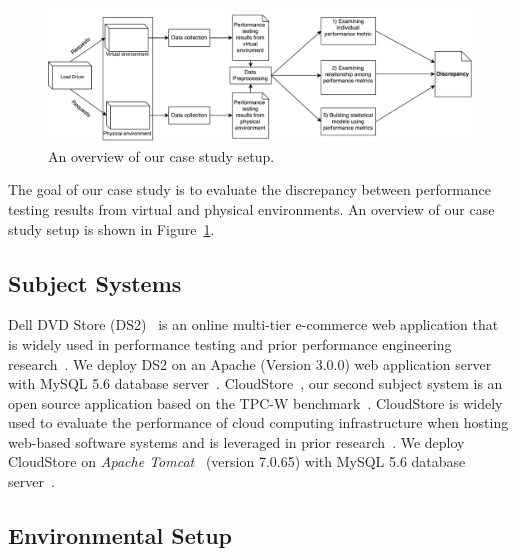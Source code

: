 
\begin{figure}[thb]
	\includegraphics[width=.9\textwidth]{figures/overview}
	\caption{An overview of our case study setup.}
	\label{fig:Approach}
\end{figure}

The goal of our case study is to evaluate the discrepancy between performance testing results from virtual and physical environments. An overview of our case study setup is shown in Figure~\ref{fig:Approach}.


\subsection{Subject Systems}
Dell DVD Store (DS2)~\cite{delldvd} is an online multi-tier e-commerce web application that is widely used in performance testing and prior performance engineering research~\cite{Shang:2015:ADP:2668930.2688052,Nguyen:2012:ADP:2188286.2188344, jackicsm2009}. We deploy DS2 on an Apache (Version 3.0.0) web application server with MySQL 5.6 database server~\cite{mysql}. CloudStore~\cite{cloudstore}, our second subject system is an open source application based on the TPC-W benchmark~\cite{tpcw}. CloudStore is widely used to evaluate the performance of cloud computing infrastructure when hosting web-based software systems and is leveraged in prior research~\cite{tarekmsr16}. We deploy CloudStore on \textit{Apache Tomcat}~\cite{tomcat} (version 7.0.65) with MySQL 5.6 database server~\cite{mysql}. 


\subsection{Environmental Setup}

